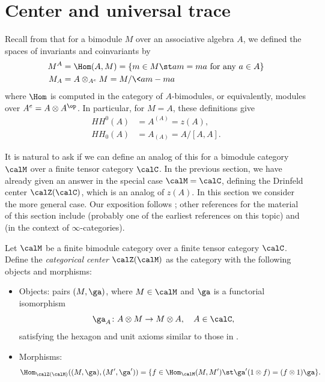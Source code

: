 \section{Center and universal trace}\label{s:cat-trace}
Recall from  that for a bimodule $M$ over an associative
algebra $A$, we defined the spaces of invariants and coinvariants by
\begin{equation}
  \begin{aligned}
    M^{A}&=\Hom(A,M)=\{m\in M\st am=ma \text{ for any } a\in A\}\\
    M_{A}&=A\otimes_{A^e} M = M/\<am-ma\>
  \end{aligned}
\end{equation}
where $\Hom$ is computed in the category of $A$-bimodules, or equivalently,
modules over $A^e=A\otimes A^\op$. In particular, for $M=A$, these definitions
give
\begin{align*}
  HH^0(A)&=A^{(A)}=z(A),\\
  HH_0(A)&=A_{(A)}= A/[A,A].
\end{align*}

It is natural to ask if we can define an analog of this for a bimodule category
$\calM$ over a finite tensor category $\calC$. In the previous section, we have
already given an answer in the special case $\calM=\calC$, defining the Drinfeld
center $\calZ(\calC)$, which is an analog of $z(A)$. In this section we
consider the more general case. Our exposition follows
\cite{fuchs-schaumann-schweigert-trace}; other references for the material of
this section include \cite{greenough} (probably one of the earliest references
on this topic) and \cite[Section 5]{benzvi-francis-nadler} (in the context
of $\infty$-categories).

\begin{definition}\label{d:cat-center}
  Let $\calM$ be a finite bimodule category over a finite tensor category
  $\calC$. Define the \emph{categorical center}
  $\calZ(\calM)$ as the category
  with the following objects and morphisms:
    \begin{itemize}
      \item Objects: pairs $(M, \ga)$, where $M\in \calM$ and $\ga$ is a
      functorial isomorphism
      $$
        \ga_A\colon A\otimes M\to M\otimes A, \quad A\in \calC,
      $$
      satisfying the hexagon and unit axioms similar to those in
      .
      \item Morphisms:
      $$
      \Hom_{\calZ(\calM)}((M, \ga), (M', \ga'))
        =\{f \in \Hom_\calM(M,M')\st \ga' (1 \otimes f) =(f\otimes 1) \ga\}.
      $$
    \end{itemize}
  \end{definition}

